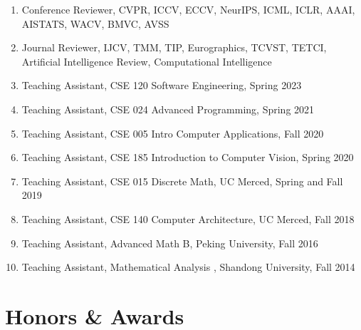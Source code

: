 \documentclass[letterpaper]{article}
\begin{document}
\begin{enumerate}

\item Conference Reviewer, CVPR, ICCV, ECCV, NeurIPS, ICML, ICLR, AAAI, AISTATS, WACV, BMVC, AVSS

\item Journal Reviewer, IJCV, TMM, TIP, Eurographics, TCVST, TETCI, Artificial Intelligence Review, Computational Intelligence

\item Teaching Assistant, CSE 120 Software Engineering, Spring 2023

\item Teaching Assistant, CSE 024 Advanced Programming, Spring 2021

\item Teaching Assistant, CSE 005 Intro Computer Applications, Fall 2020

\item Teaching Assistant, CSE 185 Introduction to Computer Vision, Spring 2020

\item Teaching Assistant, CSE 015 Discrete Math, UC Merced, Spring and Fall 2019

\item Teaching Assistant, CSE 140 Computer Architecture, UC Merced, Fall 2018

\item Teaching Assistant, Advanced Math B, Peking University, Fall 2016

\item Teaching Assistant, Mathematical Analysis \uppercase\expandafter{}, Shandong University, Fall 2014

\end{enumerate}




\section*{Honors \& Awards}
\end{document}
